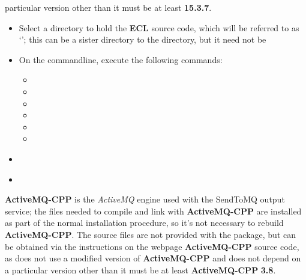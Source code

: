 particular version \longDash{} other than it must be at least \textbf{15.3.7}.
\begin{itemize}
\item Select a directory to hold the \textbf{ECL} source code, which will be referred to
as `'; this can be a sister directory to the 
directory, but it need not be
\item\exSp{}On the command\longDash{}line, execute the following commands:
\begin{itemize}
\item{}
\item\exSp{}
\item\exSp{}
\item\exSp{}
\item\exSp{}
\item\exSp{}
\end{itemize}
\end{itemize}
\tertiaryEnd
{}
\begin{itemize}
\item\TBD
\end{itemize}
\tertiaryEnd
{}
\begin{itemize}
\item\TBD
\end{itemize}
\tertiaryEnd
\secondaryEnd
{}
\textbf{ActiveMQ-CPP} is the \emph{ActiveMQ} engine used with the SendToMQ output service;
the files needed to compile and link with \textbf{ActiveMQ-CPP} are installed as part of
the normal \mplusm{} installation procedure, so it's not necessary to rebuild
\textbf{ActiveMQ-CPP}.
The source files are not provided with the  package, but can be obtained
via the instructions on the web\longDash{}page
%
{\textbf{ActiveMQ-CPP} source code}, as \mplusm{} does not use a modified version of
\textbf{ActiveMQ-CPP} and does not depend on a particular version \longDash{} other than
it must be at least \textbf{ActiveMQ-CPP} \textbf{3.8}.\\

